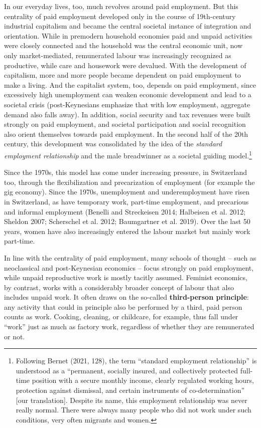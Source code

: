 \documentclass[
  british,
  a4paper,
  DIV=11,
  numbers=noendperiod,
  oneside,
  openany]{scrreprt}
\begin{document}
In our everyday lives, too, much revolves around paid employment. But
this centrality of paid employment developed only in the course of
19th-century industrial capitalism and became the central societal
instance of integration and orientation. While in premodern household
economies paid and unpaid activities were closely connected and the
household was the central economic unit, now only market-mediated,
remunerated labour was increasingly recognized as productive, while care
and housework were devalued. With the development of capitalism, more
and more people became dependent on paid employment to make a living.
And the capitalist system, too, depends on paid employment, since
excessively high unemployment can weaken economic development and lead
to a societal crisis (post-Keynesians emphasize that with low
employment, aggregate demand also falls away). In addition, social
security and tax revenues were built strongly on paid employment, and
societal participation and social recognition also orient themselves
towards paid employment. In the second half of the 20th century, this
development was consolidated by the idea of the \emph{standard
employment relationship} and the male breadwinner as a societal guiding
model.\footnote{Following Bernet (2021, 128), the term ``standard
  employment relationship'' is understood as a ``permanent, socially
  insured, and collectively protected full-time position with a secure
  monthly income, clearly regulated working hours, protection against
  dismissal, and certain instruments of co-determination'' {[}our
  translation{]}. Despite its name, this employment relationship was
  never really normal. There were always many people who did not work
  under such conditions, very often migrants and women.}

Since the 1970s, this model has come under increasing pressure, in
Switzerland too, through the flexibilization and precarization of
employment (for example the gig economy). Since the 1970s, unemployment
and underemployment have risen in Switzerland, as have temporary work,
part-time employment, and precarious and informal employment (Benelli
and Streckeisen 2014; Halbeisen et al. 2012; Sheldon 2007; Scherschel et
al. 2012; Baumgartner et al. 2019). Over the last 50 years, women have
also increasingly entered the labour market but mainly work part-time.

In line with the centrality of paid employment, many schools of thought
-- such as neoclassical and post-Keynesian economics -- focus strongly
on paid employment, while unpaid reproductive work is mostly tacitly
assumed. Feminist economics, by contrast, works with a considerably
broader concept of labour that also includes unpaid work. It often draws
on the so-called \textbf{third-person principle}: any activity that
could in principle also be performed by a third, paid person counts as
work. Cooking, cleaning, or childcare, for example, thus fall under
``work'' just as much as factory work, regardless of whether they are
remunerated or not.
\end{document}
